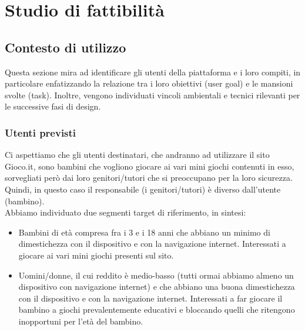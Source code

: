 \documentclass[../Report.tex]{subfiles}
\begin{document}
    \chapter{Studio di fattibilità}
    \section{Contesto di utilizzo}
    Questa sezione mira ad identificare gli utenti della piattaforma e i loro compiti, in particolare enfatizzando la relazione tra i loro obiettivi (user goal) e le mansioni svolte (task). Inoltre, vengono individuati vincoli ambientali e tecnici rilevanti per le successive fasi di design.
        
        \subsection{Utenti previsti}
        Ci aspettiamo che gli utenti destinatari, che andranno ad utilizzare il sito Gioco.it, sono bambini che vogliono giocare ai vari mini giochi contenuti in esso, sorvegliati però dai loro genitori/tutori che si preoccupano per la loro sicurezza. Quindi, in questo caso il responsabile (i genitori/tutori) è diverso dall'utente (bambino).\\
        Abbiamo individuato due segmenti target di riferimento, in sintesi:
        \begin{itemize}
            \item Bambini di età compresa fra i 3 e i 18 anni che abbiano un minimo di dimestichezza con il dispositivo e con la navigazione internet. Interessati a giocare ai vari mini giochi presenti sul sito.
            \item Uomini/donne, il cui reddito è medio-basso (tutti ormai abbiamo almeno un dispositivo con navigazione internet) e che abbiano una buona dimestichezza con il dispositivo e con la navigazione internet. Interessati a far giocare il bambino a giochi prevalentemente educativi e bloccando quelli che ritengono inopportuni per l'età del bambino.
        \end{itemize} 
\end{document}
